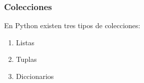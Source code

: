 \begin{frame}[fragile]
  \frametitle{Colecciones}

  En Python existen tres tipos de colecciones:

  \begin{enumerate}[1.]
    \item Listas
    \item Tuplas
    \item Diccionarios
  \end{enumerate}
  
  
\end{frame}

